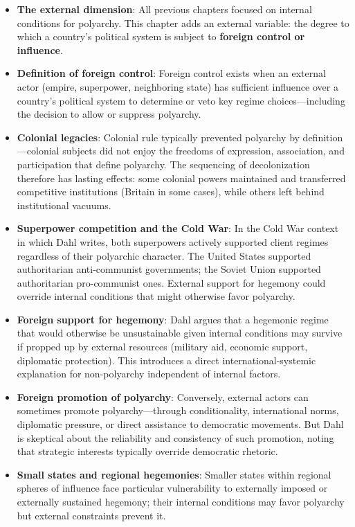 \documentclass[12pt]{article}
\begin{document}
\begin{itemize}[leftmargin=*, itemsep=4pt]
    \item \textbf{The external dimension}: All previous chapters focused on internal conditions for polyarchy. This chapter adds an external variable: the degree to which a country's political system is subject to \textbf{foreign control or influence}.
    \item \textbf{Definition of foreign control}: Foreign control exists when an external actor (empire, superpower, neighboring state) has sufficient influence over a country's political system to determine or veto key regime choices---including the decision to allow or suppress polyarchy.
    \item \textbf{Colonial legacies}: Colonial rule typically prevented polyarchy by definition---colonial subjects did not enjoy the freedoms of expression, association, and participation that define polyarchy. The sequencing of decolonization therefore has lasting effects: some colonial powers maintained and transferred competitive institutions (Britain in some cases), while others left behind institutional vacuums.
    \item \textbf{Superpower competition and the Cold War}: In the Cold War context in which Dahl writes, both superpowers actively supported client regimes regardless of their polyarchic character. The United States supported authoritarian anti-communist governments; the Soviet Union supported authoritarian pro-communist ones. External support for hegemony could override internal conditions that might otherwise favor polyarchy.
    \item \textbf{Foreign support for hegemony}: Dahl argues that a hegemonic regime that would otherwise be unsustainable given internal conditions may survive if propped up by external resources (military aid, economic support, diplomatic protection). This introduces a direct international-systemic explanation for non-polyarchy independent of internal factors.
    \item \textbf{Foreign promotion of polyarchy}: Conversely, external actors can sometimes promote polyarchy---through conditionality, international norms, diplomatic pressure, or direct assistance to democratic movements. But Dahl is skeptical about the reliability and consistency of such promotion, noting that strategic interests typically override democratic rhetoric.
    \item \textbf{Small states and regional hegemonies}: Smaller states within regional spheres of influence face particular vulnerability to externally imposed or externally sustained hegemony; their internal conditions may favor polyarchy but external constraints prevent it.

\end{itemize}
\end{document}
